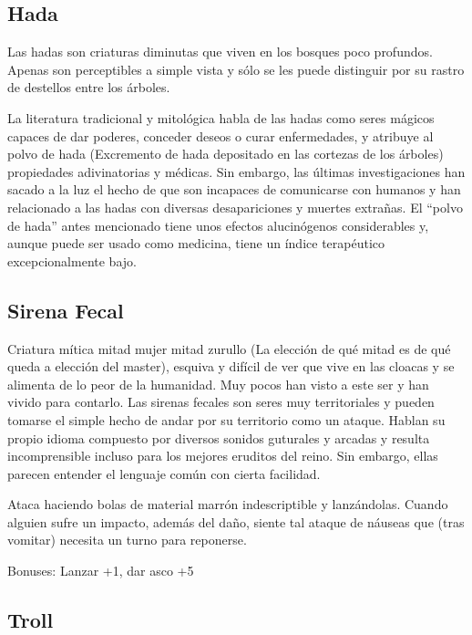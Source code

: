 \subsection*{Hada}

Las hadas son criaturas diminutas que viven en los bosques poco profundos. Apenas son perceptibles a simple vista y sólo se les puede distinguir por su rastro de destellos entre los árboles. 
\par 
La literatura tradicional y mitológica habla de las hadas como seres mágicos capaces de dar poderes, conceder deseos o curar enfermedades, y atribuye al polvo de hada (Excremento de hada depositado en las cortezas de los árboles) propiedades adivinatorias y médicas. Sin embargo, las últimas investigaciones han sacado a la luz el hecho de que son incapaces de comunicarse con humanos y han relacionado a las hadas con diversas desapariciones y muertes extrañas. El ``polvo de hada'' antes mencionado tiene unos efectos alucinógenos considerables y, aunque puede ser usado como medicina, tiene un índice terapéutico excepcionalmente bajo. 

\subsection*{Sirena Fecal}

Criatura mítica mitad mujer mitad zurullo (La elección de qué mitad es de qué queda a elección del master), esquiva y difícil de ver que vive en las cloacas y se alimenta de lo peor de la humanidad. Muy pocos han visto a este ser y han vivido para contarlo. Las sirenas fecales son seres muy territoriales y pueden tomarse el simple hecho de andar por su territorio como un ataque. Hablan su propio idioma compuesto por diversos sonidos guturales y arcadas y resulta incomprensible incluso para los mejores eruditos del reino. Sin embargo, ellas parecen entender el lenguaje común con cierta facilidad.
\par 
Ataca haciendo bolas de material marrón indescriptible y lanzándolas. Cuando alguien sufre un impacto, además del daño, siente tal ataque de náuseas que (tras vomitar) necesita un turno para reponerse. 
\par 
Bonuses: Lanzar +1, dar asco +5

\subsection*{Troll}

